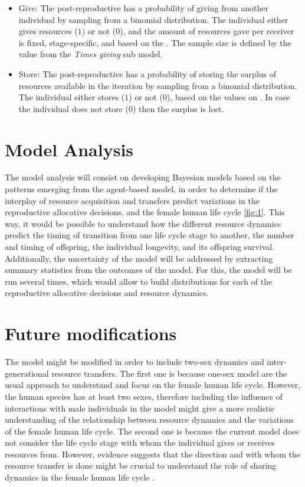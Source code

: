 \documentclass{article}
\begin{document}
\begin{itemize}
\begin{itemize}
        \item Give: The post-reproductive has a probability of giving from another individual by sampling from a binomial distribution. The individual either gives resources ($1$) or not ($0$), and the amount of resources gave per receiver is fixed, stage-specific, and based on the \cite{gurven2004give}. The sample size is defined by the value from the \emph{Times giving} sub model. 
        \item Store: The post-reproductive has a probability of storing the surplus of resources available in the iteration by sampling from a binomial distribution. The individual either stores ($1$) or not ($0$), based on the values on \citep{bowles2011cultivation}. In case the individual does not store ($0$) then the surplus is lost.
    \end{itemize}
\end{itemize}

\section{Model Analysis}

The model analysis will consist on developing Bayesian models based on the patterns emerging from the agent-based model, in order to determine if the interplay of resource acquisition and transfers predict variations in the reproductive allocative decisions, and the female human life cycle \ref{fig:1}. This way, it would be possible to understand how the different resource dynamics predict the timing of transition from one life cycle stage to another, the number and timing of offspring, the individual longevity, and its offspring survival. Additionally, the uncertainty of the model will be addressed by extracting summary statistics from the outcomes of the model. For this, the model will be run several times, which would allow to build distributions for each of the reproductive allocative decisions and resource dynamics.

\section{Future modifications}

The model might be modified in order to include two-sex dynamics and inter-generational resource transfers. The first one is because one-sex model are the usual approach to understand and focus on the female human life cycle. However, the human species has at least two sexes, therefore including the influence of interactions with male individuals in the model might give a more realistic understanding of the relationship between resource dynamics and the variations of the female human life cycle. The second one is because the current model does not consider the life cycle stage with whom the individual gives or receives resources from. However, evidence suggests that the direction and with whom the resource transfer is done might be crucial to understand the role of sharing dynamics in the female human life cycle \citep{hooper2015inclusive,jones2015resource}.
\end{document}
